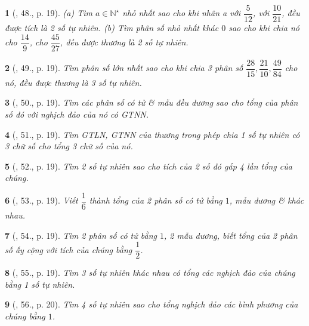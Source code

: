 \documentclass{article}
\newtheorem{baitoan}{}
\begin{document}
\begin{baitoan}[\cite{Binh_Toan_6_tap_2}, 48., p. 19]
	(a) Tìm $a\in\mathbb{N}^\star$ nhỏ nhất sao cho khi nhân a với $\dfrac{5}{12}$, với $\dfrac{10}{21}$, đều được tích là 2 số tự nhiên. (b) Tìm phân số nhỏ nhất khác $0$ sao cho khi chia nó cho $\dfrac{14}{9}$, cho $\dfrac{45}{27}$, đều được thương là 2 số tự nhiên.
\end{baitoan}

\begin{baitoan}[\cite{Binh_Toan_6_tap_2}, 49., p. 19]
	Tìm phân số lớn nhất sao cho khi chia 3 phân số $\dfrac{28}{15},\dfrac{21}{10},\dfrac{49}{84}$ cho nó, đều được thương là 3 số tự nhiên.
\end{baitoan}

\begin{baitoan}[\cite{Binh_Toan_6_tap_2}, 50., p. 19]
	Tìm các phân số có tử \& mẫu đều dương sao cho tổng của phân số đó với nghịch đảo của nó có {\rm GTNN}.
\end{baitoan}

\begin{baitoan}[\cite{Binh_Toan_6_tap_2}, 51., p. 19]
	Tìm {\rm GTLN, GTNN} của thương trong phép chia 1 số tự nhiên có 3 chữ số cho tổng 3 chữ số của nó.
\end{baitoan}

\begin{baitoan}[\cite{Binh_Toan_6_tap_2}, 52., p. 19]
	Tìm 2 số tự nhiên sao cho tích của 2 số đó gấp 4 lần tổng của chúng.
\end{baitoan}

\begin{baitoan}[\cite{Binh_Toan_6_tap_2}, 53., p. 19]
	Viết $\dfrac{1}{6}$ thành tổng của 2 phân số có tử bằng $1$, mẫu dương \& khác nhau.
\end{baitoan}

\begin{baitoan}[\cite{Binh_Toan_6_tap_2}, 54., p. 19]
	Tìm 2 phân số có tử bằng $1$, 2 mẫu dương, biết tổng của 2 phân số ấy cộng với tích của chúng bằng $\dfrac{1}{2}$.
\end{baitoan}

\begin{baitoan}[\cite{Binh_Toan_6_tap_2}, 55., p. 19]
	Tìm 3 số tự nhiên khác nhau có tổng các nghịch đảo của chúng bằng 1 số tự nhiên.
\end{baitoan}

\begin{baitoan}[\cite{Binh_Toan_6_tap_2}, 56., p. 20]
	Tìm 4 số tự nhiên sao cho tổng nghịch đảo các bình phương của chúng bằng $1$.
\end{baitoan}
\end{document}
